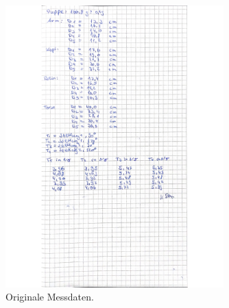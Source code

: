 \begin{figure}[H]
  \centering
  \includegraphics[width=0.75\textwidth]{Bilder/daten2.jpg}
  \caption{Originale Messdaten.}
  \label{fig:daten2}
\end{figure}